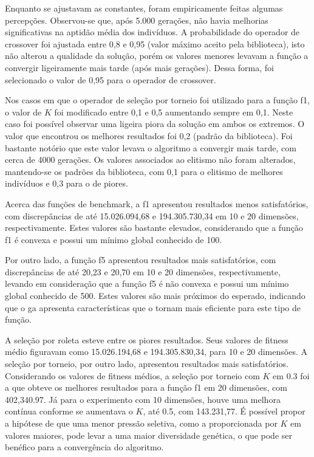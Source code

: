 Enquanto se ajustavam as constantes, foram empiricamente feitas algumas percepções.
Observou-se que, após 5.000 gerações, não havia melhorias significativas na aptidão média dos indivíduos.
A probabilidade do operador de crossover foi ajustada entre 0,8 e 0,95 (valor máximo aceito pela biblioteca), isto não alterou a qualidade da solução, porém os valores menores levavam a função a convergir ligeiramente mais tarde (após mais gerações).
Dessa forma, foi selecionado o valor de 0,95 para o operador de crossover.

Nos casos em que o operador de seleção por torneio foi utilizado para a função \gls{f1}, o valor de \( K \) foi modificado entre 0,1 e 0,5 aumentando sempre em 0,1.
Neste caso foi possível observar uma ligeira piora da solução em ambos os extremos.
O valor que encontrou os melhores resultados foi 0,2 (padrão da biblioteca).
Foi bastante notório que este valor levava o algoritmo a convergir mais tarde, com cerca de 4000 gerações.
Os valores associados ao elitismo não foram alterados, mantendo-se os padrões da biblioteca, com 0,1 para o elitismo de melhores indivíduos e 0,3 para o de piores.

Acerca das funções de benchmark, a \gls{f1} apresentou resultados menos satisfatórios, com discrepâncias de até 15.026.094,68 e 194.305.730,34 em 10 e 20 dimensões, respectivamente.
Estes valores são bastante elevados, considerando que a função \gls{f1} é convexa e possui um mínimo global conhecido de 100.

Por outro lado, a função \gls{f5} apresentou resultados mais satisfatórios, com discrepâncias de até 20,23 e 20,70 em 10 e 20 dimensões, respectivamente, levando em consideração que a função \gls{f5} é não convexa e possui um mínimo global conhecido de 500.
Estes valores são mais próximos do esperado, indicando que o \gls{ga} apresenta características que o tornam mais eficiente para este tipo de função.

A seleção por roleta esteve entre os piores resultados. Seus valores de \gls{fitness} médio figuravam como 15.026.194,68 e 194.305.830,34, para 10 e 20 dimensões.
A seleção por torneio, por outro lado, apresentou resultados mais satisfatórios.
Considerando os valores de \gls{fitness} médios, a seleção por torneio com \( K \) em 0.3 foi a que obteve os melhores resultados para a função \gls{f1} em 20 dimensões, com 402,340.97.
Já para o experimento com 10 dimensões, houve uma melhora contínua conforme se aumentava o \( K \), até 0.5, com 143.231,77.
É possível propor a hipótese de que uma menor pressão seletiva, como a proporcionada por \( K \) em valores maiores, pode levar a uma maior diversidade genética, o que pode ser benéfico para a convergência do algoritmo.

